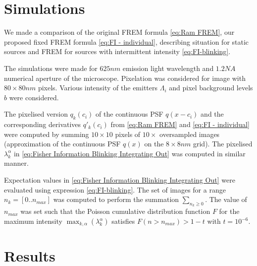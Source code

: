 
\section{Simulations\label{sec:FREM simulations}} 
We made a comparison of the original FREM formula \autoref{eq:Ram FREM}, our proposed fixed FREM formula \autoref{eq:FI - individual}, describing situation for static sources and FREM for sources with intermittent intensity \autoref{eq:FI-blinking}.

The simulations were made for $625\unit{nm}$ emission light wavelength and $1.2\unit{NA}$ numerical aperture of the microscope. Pixelation was considered for image with $80\times80\unit{nm}$ pixels. Various intensity of the emitters $\Lambda_i$ and pixel background levels $b$ were considered.

The pixelised version $q_k(c_i)$ of the continuous PSF $q(x-c_i)$ and the corresponding derivatives $q'_k(c_i)$ from \autoref{eq:Ram FREM} and \autoref{eq:FI - individual} were computed by summing $10\times10$ pixels of $10\times$ oversampled images (approximation of the continuous PSF $q(x)$ on the $8\times8 \unit{nm}$ grid). The pixelised $\lambda^\alpha_k$ in \autoref{eq:Fisher Information Blinking Integrating Out} was computed in similar manner. 

Expectation values in \autoref{eq:Fisher Information Blinking Integrating Out} were evaluated using expression \autoref{eq:FI-blinking}. The set of images for a range $n_k=[0..n_{max}]$ was computed to perform the summation $\sum_{n_k\geq0}$. The value of $n_{max}$ was set such that the Poisson cumulative distribution function $F$ for the maximum intensity $\max_{k,\alpha}(\lambda_k^\alpha)$ satisfies $F(n>n_{max})>1-t$ with $t=10^{-6}$. 


\section{Results\label{sec:FREM results}}

